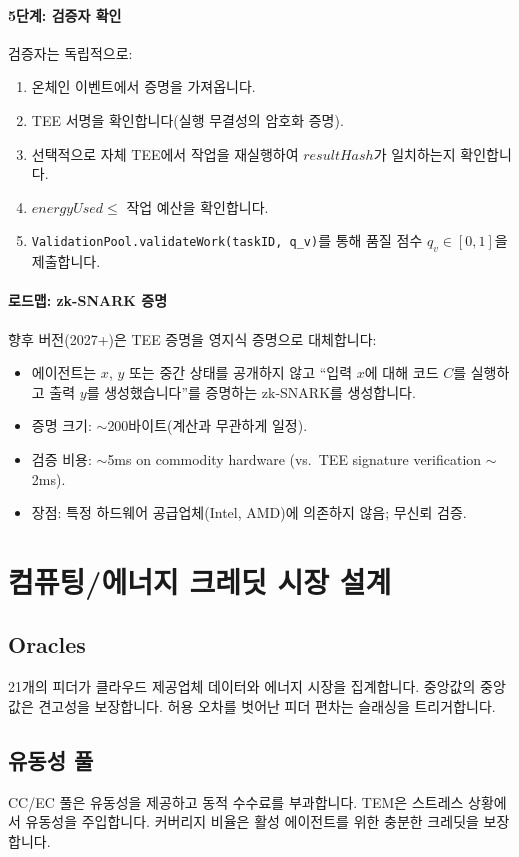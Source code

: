 \documentclass[11pt]{article}
\begin{document}
\paragraph{5단계: 검증자 확인}
검증자는 독립적으로:
\begin{enumerate}[noitemsep]
  \item 온체인 이벤트에서 증명을 가져옵니다.
  \item TEE 서명을 확인합니다(실행 무결성의 암호화 증명).
  \item 선택적으로 자체 TEE에서 작업을 재실행하여 $resultHash$가 일치하는지 확인합니다.
  \item $energyUsed \leq$ 작업 예산을 확인합니다.
  \item \texttt{ValidationPool.validateWork(taskID, q\_v)}를 통해 품질 점수 $q_v \in [0,1]$을 제출합니다.
\end{enumerate}

\paragraph{로드맵: zk-SNARK 증명}
향후 버전(2027+)은 TEE 증명을 영지식 증명으로 대체합니다:
\begin{itemize}[noitemsep]
  \item 에이전트는 $x$, $y$ 또는 중간 상태를 공개하지 않고 ``입력 $x$에 대해 코드 $C$를 실행하고 출력 $y$를 생성했습니다''를 증명하는 zk-SNARK를 생성합니다.
  \item 증명 크기: $\sim$200바이트(계산과 무관하게 일정).
  \item 검증 비용: $\sim$5ms on commodity hardware (vs.\ TEE signature verification $\sim$2ms).
  \item 장점: 특정 하드웨어 공급업체(Intel, AMD)에 의존하지 않음; 무신뢰 검증.
\end{itemize}

\section{컴퓨팅/에너지 크레딧 시장 설계}
\subsection{Oracles}
21개의 피더가 클라우드 제공업체 데이터와 에너지 시장을 집계합니다. 중앙값의 중앙값은 견고성을 보장합니다. 허용 오차를 벗어난 피더 편차는 슬래싱을 트리거합니다.

\subsection{유동성 풀}
CC/EC 풀은 유동성을 제공하고 동적 수수료를 부과합니다. TEM은 스트레스 상황에서 유동성을 주입합니다. 커버리지 비율은 활성 에이전트를 위한 충분한 크레딧을 보장합니다.
\end{document}
